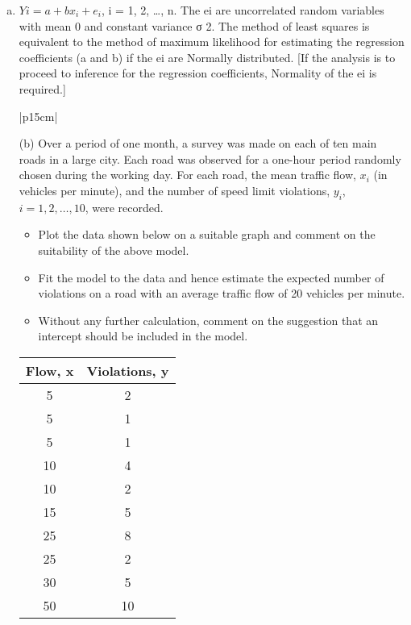 \documentclass[a4paper,12pt]{article}
\begin{document}
\begin{enumerate}[(a)]
\item $Yi = a + bx_i + e_i$, i = 1, 2, …, n.
The {ei} are uncorrelated random variables with mean 0 and constant variance σ 2.
The method of least squares is equivalent to the method of maximum likelihood for estimating the regression coefficients (a and b) if the {ei} are Normally distributed.
[If the analysis is to proceed to inference for the regression coefficients, Normality of the {ei} is required.]

\newpage


\begin{table}[ht!]
     
\centering
     
\begin{tabular}{|p{15cm}|}
     
\hline        

\noindent

(b) Over a period of one month, a survey was made on each of ten main roads in a large city. 
Each road was observed for a one-hour period randomly chosen during the working day. 
For each road, the mean traffic flow, $x_i$ (in vehicles per minute), and the number of speed limit violations, $y_i$, $i = 1, 2, \ldots, 10$, were recorded. 
\begin{itemize}
    \item Plot the data shown below on a suitable graph and comment on the suitability of the above model. 
\item Fit the model to the data and hence estimate the expected number of violations on a road 
with an average traffic flow of 20 vehicles per minute.
\item Without any further calculation, comment 
on the suggestion that an intercept should be included in the model.
\end{itemize}

\begin{center}
\begin{tabular}{c|c}
Flow, x	&	Violations, y	\\ \hline
5	&	2	\\ \hline
5	&	1	\\ \hline
5	&	1	\\ \hline
10	&	4	\\ \hline
10	&	2	\\ \hline
15	&	5	\\ \hline
25	&	8	\\ \hline
25	&	2	\\ \hline
30	&	5	\\ \hline
50	&	10	\\ \hline
\end{tabular}
\end{center}
\\ \hline
      

\end{tabular}
\end{table}
\end{enumerate}
\end{document}
